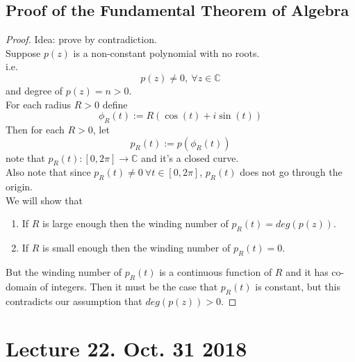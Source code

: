 \documentclass[10pt]{article}
\begin{document}
		\subsection{Proof of the Fundamental Theorem of Algebra}
		\begin{proof}
			Idea: prove by contradiction. \\
			Suppose $p(z)$ is a non-constant polynomial with no roots. \\
			i.e. 
			\[
				p(z) \neq 0,\ \forall z \in \mathbb{C}
			\]
			and degree of $p(z) = n > 0$. \\
			For each radius $R>0$ define 
			\[
				\phi_R(t) := R(\cos(t) + i \sin(t))
			\]
			Then for each $R>0$, let 
			\[
				p_R(t) := p(\phi_R(t))
			\]
			note that $p_R(t): [0, 2\pi] \to \mathbb{C}$ and it's a closed curve. \\
			Also note that since $p_R(t) \neq 0\ \forall t \in [0, 2\pi]$, $p_R(t)$ does not go through the origin. \\
			We will show that
			\begin{enumerate}
				\item If $R$ is large enough then the winding number of $p_R(t) = deg(p(z))$.
				\item If $R$ is small enough then the winding number of $p_R(t) = 0$.
			\end{enumerate}
			But the winding number of $p_R(t)$ is a continuous function of $R$ and it has co-domain of integers. Then it must be the case that $p_R(t)$ is constant, but this contradicts our assumption that $deg(p(z)) > 0$.
		\end{proof}
		
	\section{Lecture 22. Oct. 31 2018}
\end{document}
